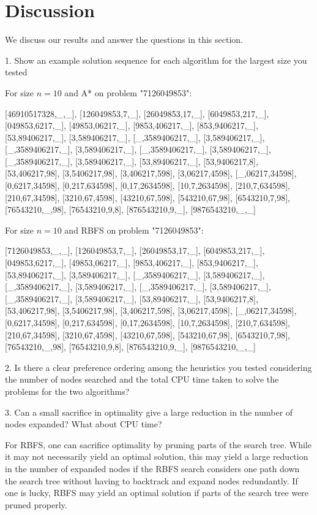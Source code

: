 \section{Discussion}

We discuss our results and answer the questions in this section.

1. Show an example solution sequence for each algorithm for the largest size you tested

For size $n = 10$ and A* on problem "7126049853":

[46910517328,\_,\_], [126049853,7,\_], [26049853,17,\_], [6049853,217,\_], [049853,6217,\_], [49853,06217,\_], [9853,406217,\_], [853,9406217,\_], [53,89406217,\_], [3,589406217,\_], [\_,3589406217,\_], [3,589406217,\_], [\_,3589406217,\_], [3,589406217,\_], [\_,3589406217,\_], [3,589406217,\_], [\_,3589406217,\_], [3,589406217,\_], [53,89406217,\_], [53,9406217,8], [53,406217,98], [3,5406217,98], [3,406217,598], [3,06217,4598], [\_,06217,34598], [0,6217,34598], [0,217,634598], [0,17,2634598], [10,7,2634598], [210,7,634598], [210,67,34598], [3210,67,4598], [43210,67,598], [543210,67,98], [6543210,7,98], [76543210,\_,98], [76543210,9,8], [876543210,9,\_], [9876543210,\_,\_]

For size $n = 10$ and RBFS on problem "7126049853":

[7126049853,\_,\_], [126049853,7,\_], [26049853,17,\_], [6049853,217,\_], [049853,6217,\_], [49853,06217,\_], [9853,406217,\_], [853,9406217,\_], [53,89406217,\_], [3,589406217,\_], [\_,3589406217,\_], [3,589406217,\_], [\_,3589406217,\_], [3,589406217,\_], [\_,3589406217,\_], [3,589406217,\_], [\_,3589406217,\_], [3,589406217,\_], [53,89406217,\_], [53,9406217,8], [53,406217,98], [3,5406217,98], [3,406217,598], [3,06217,4598], [\_,06217,34598], [0,6217,34598], [0,217,634598], [0,17,2634598], [10,7,2634598], [210,7,634598], [210,67,34598], [3210,67,4598], [43210,67,598], [543210,67,98], [6543210,7,98], [76543210,\_,98], [76543210,9,8], [876543210,9,\_], [9876543210,\_,\_]

2. Is there a clear preference ordering among the heuristics you tested considering the number of nodes searched and the total CPU time taken to solve the problems for the two algorithms?

3. Can a small sacrifice in optimality give a large reduction in the number of nodes expanded? What about CPU time?

For RBFS, one can sacrifice optimality by pruning parts of the search tree. While it may not necessarily yield an optimal solution, this may yield a large reduction in the number of expanded nodes if the RBFS search considers one path down the search tree without having to backtrack and expand nodes redundantly. If one is lucky, RBFS may yield an optimal solution if parts of the search tree were pruned properly.

